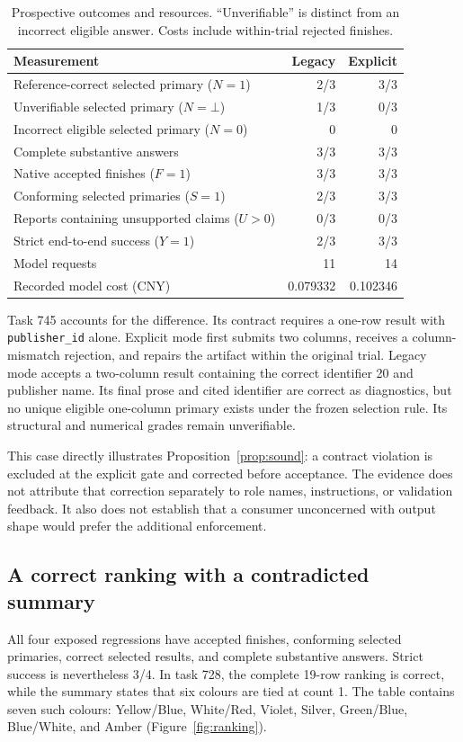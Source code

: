 \documentclass{article}
\newcommand{\code}[1]{\texttt{#1}}
\newcommand{\botval}{\bot}
\begin{document}
\begin{table}[t]
\caption{Prospective outcomes and resources. ``Unverifiable'' is distinct from an incorrect eligible answer. Costs include within-trial rejected finishes.}
\label{tab:primary}
\centering\small
\begin{tabular}{@{}L{3.32in}rr@{}}
\toprule
Measurement & Legacy & Explicit\\
\midrule
Reference-correct selected primary ($N=1$) & 2/3 & 3/3\\
Unverifiable selected primary ($N=\botval$) & 1/3 & 0/3\\
Incorrect eligible selected primary ($N=0$) & 0 & 0\\
Complete substantive answers & 3/3 & 3/3\\
Native accepted finishes ($F=1$) & 3/3 & 3/3\\
Conforming selected primaries ($S=1$) & 2/3 & 3/3\\
Reports containing unsupported claims ($U>0$) & 0/3 & 0/3\\
Strict end-to-end success ($Y=1$) & 2/3 & 3/3\\
\midrule
Model requests & 11 & 14\\
Recorded model cost (CNY) & 0.079332 & 0.102346\\
\bottomrule
\end{tabular}
\end{table}

Task 745 accounts for the difference. Its contract requires a one-row result with \code{publisher\_id} alone. Explicit mode first submits two columns, receives a column-mismatch rejection, and repairs the artifact within the original trial. Legacy mode accepts a two-column result containing the correct identifier 20 and publisher name. Its final prose and cited identifier are correct as diagnostics, but no unique eligible one-column primary exists under the frozen selection rule. Its structural and numerical grades remain unverifiable.

This case directly illustrates Proposition~\ref{prop:sound}: a contract violation is excluded at the explicit gate and corrected before acceptance. The evidence does not attribute that correction separately to role names, instructions, or validation feedback. It also does not establish that a consumer unconcerned with output shape would prefer the additional enforcement.

\subsection{A correct ranking with a contradicted summary}
\label{sec:regression}
All four exposed regressions have accepted finishes, conforming selected primaries, correct selected results, and complete substantive answers. Strict success is nevertheless 3/4. In task 728, the complete 19-row ranking is correct, while the summary states that six colours are tied at count 1. The table contains seven such colours: Yellow/Blue, White/Red, Violet, Silver, Green/Blue, Blue/White, and Amber (Figure~\ref{fig:ranking}).
\end{document}
